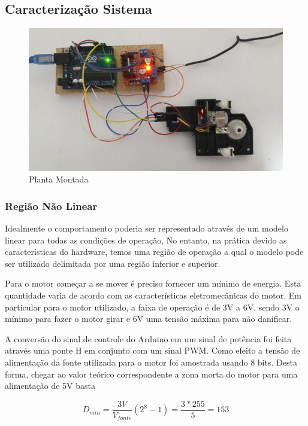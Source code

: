 \documentclass[a4paper,11pt]{article}
\begin{document}
\subsection{Caracterização Sistema}

\begin{figure}[H]
    \centering
    \includegraphics[width=\linewidth]{src/tex/img/full_system.jpg}
    \caption{Planta Montada}
    \label{fig:pid_tinkercad}
\end{figure}

\subsubsection{Região Não Linear}

Idealmente o comportamento poderia ser representado através de um modelo linear para todas as condições de operação, No entanto, na prática devido as características do hardware, temos uma região de operação a qual o modelo pode ser utilizado delimitada por uma região inferior e superior.

Para o motor começar a se mover é preciso fornecer um mínimo de energia. Esta quantidade varia de acordo com as características eletromecânicas do motor. Em particular para o motor utilizado, a faixa de operação é de 3V a 6V, sendo 3V o mínimo para fazer o motor girar e 6V uma tensão máxima para não danificar.

A conversão do sinal de controle do Arduino em um sinal de potência foi feita através uma ponte H em conjunto com um sinal PWM. Como efeito a tensão de alimentação da fonte utilizada para o motor foi amostrada usando 8 bits. Desta forma, chegar ao valor teórico correspondente a zona morta do motor para uma alimentação de 5V basta 

$$
D_{min} = \frac{3V}{V_{fonte}}(2^8 -1) = \frac{3*255}{5} = 153
$$
\end{document}
